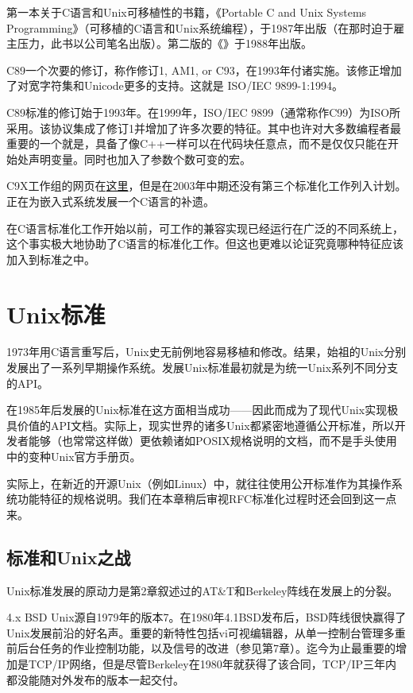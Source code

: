 \documentclass[12pt,oneside]{book}
\begin{document}
第一本关于C语言和Unix可移植性的书籍，《Portable C and Unix Systems Programming》（可移植的C语言和Unix系统编程）\cite{Lapin}，于1987年出版（在那时迫于雇主压力，此书以公司笔名出版）。第二版的《\cite{Kernighan-Ritchie}》于1988年出版。

C89一个次要的修订，称作修订1, AM1, or C93，在1993年付诸实施。该修正增加了对宽字符集和Unicode更多的支持。这就是 ISO/IEC 9899-1:1994。

C89标准的修订始于1993年。在1999年，ISO/IEC 9899（通常称作C99）为ISO所采用。该协议集成了修订1并增加了许多次要的特征。其中也许对大多数编程者最重要的一个就是，具备了像C++一样可以在代码块任意点，而不是仅仅只能在开始处声明变量。同时也加入了参数个数可变的宏。

C9X工作组的网页在\href{http://anubis.dkuug.dk/JTC1/SC22/WG14/www/projects}{这里}，但是在2003年中期还没有第三个标准化工作列入计划。正在为嵌入式系统发展一个C语言的补遗。

在C语言标准化工作开始以前，可工作的兼容实现已经运行在广泛的不同系统上，这个事实极大地协助了C语言的标准化工作。但这也更难以论证究竟哪种特征应该加入到标准之中。

\section{Unix标准}
1973年用C语言重写后，Unix史无前例地容易移植和修改。结果，始祖的Unix分别发展出了一系列早期操作系统。发展Unix标准最初就是为统一Unix系列不同分支的API。

在1985年后发展的Unix标准在这方面相当成功——因此而成为了现代Unix实现极具价值的API文档。实际上，现实世界的诸多Unix都紧密地遵循公开标准，所以开发者能够（也常常这样做）更依赖诸如POSIX规格说明的文档，而不是手头使用中的变种Unix官方手册页。

实际上，在新近的开源Unix（例如Linux）中，就往往使用公开标准作为其操作系统功能特征的规格说明。我们在本章稍后审视RFC标准化过程时还会回到这一点来。

\subsection{标准和Unix之战}
Unix标准发展的原动力是第2章叙述过的AT\&{}T和Berkeley阵线在发展上的分裂。

4.x BSD Unix源自1979年的版本7。在1980年4.1BSD发布后，BSD阵线很快赢得了Unix发展前沿的好名声。重要的新特性包括vi可视编辑器，从单一控制台管理多重前后台任务的作业控制功能，以及信号的改进（参见第7章）。迄今为止最重要的增加是TCP/IP网络，但是尽管Berkeley在1980年就获得了该合同，TCP/IP三年内都没能随对外发布的版本一起交付。
\end{document}
